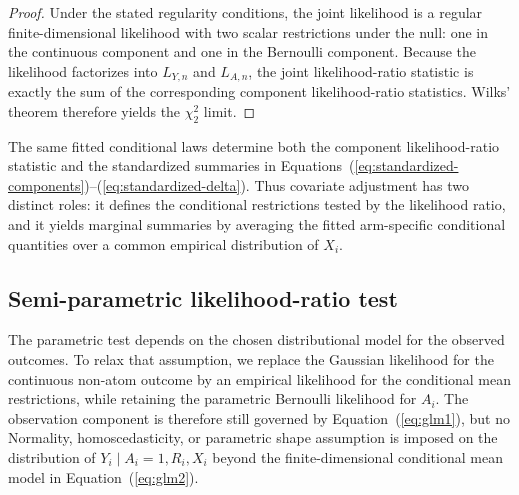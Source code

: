 \documentclass[11pt]{article}
\begin{document}
\begin{proof}
Under the stated regularity conditions, the joint likelihood is a regular finite-dimensional likelihood with two scalar restrictions under the null: one in the continuous component and one in the Bernoulli component. Because the likelihood factorizes into $L_{Y,n}$ and $L_{A,n}$, the joint likelihood-ratio statistic is exactly the sum of the corresponding component likelihood-ratio statistics. Wilks' theorem \citep{wilks1938large} therefore yields the $\chi^2_2$ limit.
\end{proof}

The same fitted conditional laws determine both the component likelihood-ratio statistic and the standardized summaries in Equations~(\ref{eq:standardized-components})--(\ref{eq:standardized-delta}). Thus covariate adjustment has two distinct roles: it defines the conditional restrictions tested by the likelihood ratio, and it yields marginal summaries by averaging the fitted arm-specific conditional quantities over a common empirical distribution of $X_i$.

\subsection{Semi-parametric likelihood-ratio test}

The parametric test depends on the chosen distributional model for the observed outcomes. To relax that assumption, we replace the Gaussian likelihood for the continuous non-atom outcome by an empirical likelihood for the conditional mean restrictions, while retaining the parametric Bernoulli likelihood for $A_i$. The observation component is therefore still governed by Equation~(\ref{eq:glm1}), but no Normality, homoscedasticity, or parametric shape assumption is imposed on the distribution of $Y_i \mid A_i = 1, R_i, X_i$ beyond the finite-dimensional conditional mean model in Equation~(\ref{eq:glm2}).
\end{document}
